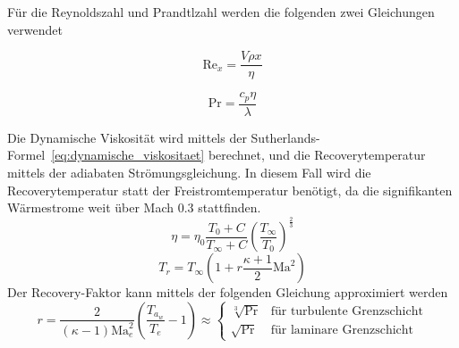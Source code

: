 Für die Reynoldszahl und Prandtlzahl werden die folgenden zwei Gleichungen verwendet
\newline
\noindent\begin{minipage}{.5\linewidth}
\begin{equation}
  \label{eq:reynolds}
  \text{Re}_x = \frac{V \rho x}{\eta}
\end{equation}
\end{minipage}%
\begin{minipage}{.5\linewidth}
\begin{equation}
  \label{eq:prandtl}
  \text{Pr} = \frac{c_p \eta}{\lambda}
\end{equation}
\end{minipage}

Die Dynamische Viskosität wird mittels der Sutherlands-Formel~\ref{eq:dynamische_viskositaet} berechnet, und die Recoverytemperatur mittels der adiabaten Strömungsgleichung.
In diesem Fall wird die Recoverytemperatur statt der Freistromtemperatur benötigt, da die signifikanten Wärmestrome weit über Mach 0.3 stattfinden.
\begin{equation}
  \label{eq:dynamische_viskositaet}
  \eta = \eta_0 \frac{T_0 + C}{T_{\infty} + C} {\left( \frac{T_{\infty}}{T_0} \right)}^{\frac{2}{3}}
\end{equation}
\begin{equation}
  \label{eq:recovery_temperatur}
  T_r = T_{\infty} \left( 1 + r \frac{\kappa + 1}{2} \text{Ma}^2 \right)
\end{equation}
Der Recovery-Faktor kann mittels der folgenden Gleichung approximiert werden
\begin{equation}
  \label{eq:recovery_faktor}
  r = \frac{2}{\left(\kappa - 1\right) \text{Ma}_e^2} \left(\frac{T_{a_{w}}}{T_e} - 1\right) \approx
  \begin{cases}
    \sqrt[3]{\text{Pr}} & \text{für turbulente Grenzschicht}\\
    \sqrt{\text{Pr}} & \text{für laminare Grenzschicht}
  \end{cases}
\end{equation}
\newpage
